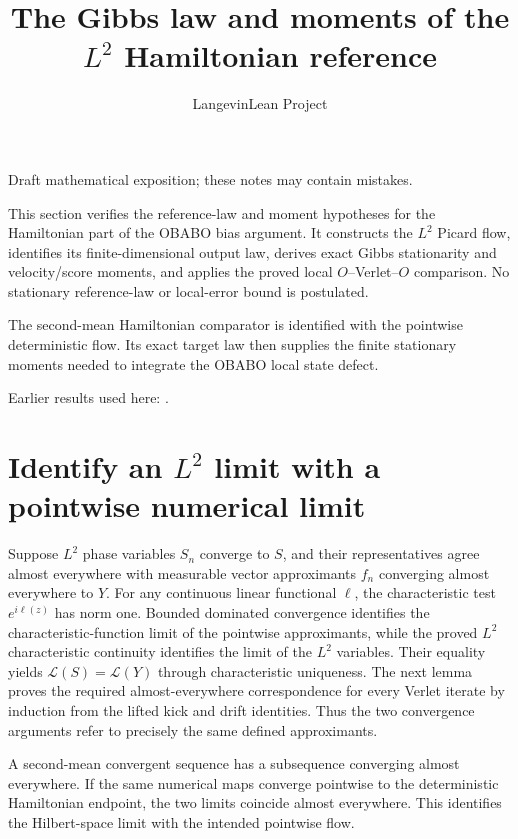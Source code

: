 \documentclass[11pt,a4paper]{article}
\title{\texorpdfstring{The Gibbs law and moments of the \(L^{2}\) Hamiltonian reference}{The Gibbs law and moments of the L² Hamiltonian reference}}
\author{LangevinLean Project}
\date{}
\begin{document}
\maketitle
Draft mathematical exposition; these notes may contain mistakes.


This section verifies the reference-law and moment hypotheses for the Hamiltonian part of the OBABO bias argument. It constructs the \(L^{2}\) Picard flow, identifies its finite-dimensional output law, derives exact Gibbs stationarity and velocity/\allowbreak{}score moments, and applies the proved local \(O\)–Verlet–\(O\) comparison. No stationary reference-law or local-error bound is postulated.



The second-mean Hamiltonian comparator is identified with the pointwise deterministic flow. Its exact target law then supplies the finite stationary moments needed to integrate the OBABO local state defect.



Earlier results used here: \cite[Section~3.28]{LangevinLean2026ULASC}.

\section{\texorpdfstring{Identify an \(L^{2}\) limit with a pointwise numerical limit}{Identify an L² limit with a pointwise numerical limit}}


Suppose \(L^{2}\) phase variables \(S_n\) converge to \(S\), and their representatives agree almost everywhere with measurable vector approximants \(f_n\) converging almost everywhere to \(Y\). For any continuous linear functional \(\ell\), the characteristic test \(e^{i\ell(z)}\) has norm one. Bounded dominated convergence identifies the characteristic-function limit of the pointwise approximants, while the proved \(L^{2}\) characteristic continuity identifies the limit of the \(L^{2}\) variables. Their equality yields \(\mathcal L(S)=\mathcal L(Y)\) through characteristic uniqueness. The next lemma proves the required almost-everywhere correspondence for every Verlet iterate by induction from the lifted kick and drift identities. Thus the two convergence arguments refer to precisely the same defined approximants.



A second-mean convergent sequence has a subsequence converging almost everywhere. If the same numerical maps converge pointwise to the deterministic Hamiltonian endpoint, the two limits coincide almost everywhere. This identifies the Hilbert-space limit with the intended pointwise flow.
\end{document}
